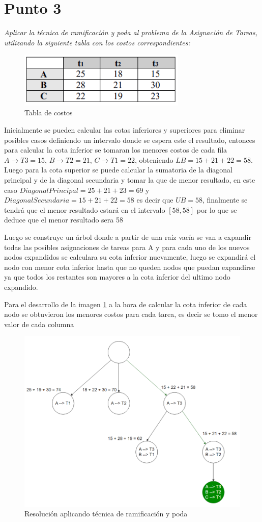 \newpage
\section{Punto 3}
\textit{Aplicar la técnica de ramificación y poda al problema de la Asignación de Tareas, utilizando la siguiente tabla con los costos correspondientes:
}
\begin{figure}[!htb]
  \centering
  \includegraphics[width=8cm, scale=1]{Images/Punto3/enunciado.png}
  \caption{Tabla de costos}
\end{figure}

Inicialmente se pueden calcular las cotas inferiores y superiores para eliminar posibles casos definiendo un intervalo donde se espera este el resultado, entonces para calcular la cota inferior se tomaran los menores costos de cada fila $A\rightarrow T3 = 15$, $B\rightarrow T2 = 21$, $C\rightarrow T1 = 22$, obteniendo $LB = 15+21+22 = 58$. Luego para la cota superior se puede calcular la sumatoria de la diagonal principal y de la diagonal secundaria y tomar la que de menor resultado, en este caso $DiagonalPrincipal = 25+21+23=69$ y $DiagonalSecundaria = 15+21+22=58$ es decir que $UB = 58$, finalmente se tendrá que el menor resultado estará en el intervalo $[58,58]$ por lo que se deduce que el menor resultado sera 58

Luego se construye un árbol donde a partir de una raíz vacía se van a expandir todas las posibles asignaciones de tareas para A y para cada uno de los nuevos nodos expandidos se calculara su cota inferior nuevamente, luego se expandirá el nodo con menor cota inferior hasta que no queden nodos que puedan expandirse ya que todos los restantes son mayores a la cota inferior del ultimo nodo expandido.

Para el desarrollo de la imagen \ref{fig:poda} a la hora de calcular la cota inferior de cada nodo se obtuvieron los menores costos para cada tarea, es decir se tomo el menor valor de cada columna

\begin{figure}[!htb]
  \centering
  \includegraphics[width=\textwidth, scale=1]{Images/Punto3/Poda.png}
  \caption{Resolución aplicando técnica de ramificación y poda}
  \label{fig:poda}
\end{figure}


